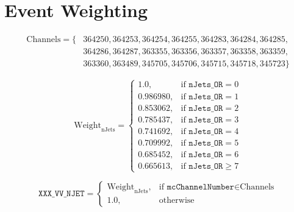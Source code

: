 \clearpage

\section{Event Weighting}
\label{appendix:weights}


\begin{align}
    \text{Channels} = \{
     & 364250, 364253, 364254, 364255, 364283, 364284, 364285,  \nonumber \\
     & 364286, 364287, 363355, 363356, 363357, 363358, 363359,            \\
     & 363360, 363489, 345705, 345706, 345715, 345718, 345723\} \nonumber
\end{align}

\begin{equation}
    \text{Weight}_{\text{nJets}} = \begin{cases}
        1.0,      & \text{if } \texttt{nJets\_OR} = 0    \\
        0.986980, & \text{if } \texttt{nJets\_OR} = 1    \\
        0.853062, & \text{if } \texttt{nJets\_OR} = 2    \\
        0.785437, & \text{if } \texttt{nJets\_OR} = 3    \\
        0.741692, & \text{if } \texttt{nJets\_OR} = 4    \\
        0.709992, & \text{if } \texttt{nJets\_OR} = 5    \\
        0.685452, & \text{if } \texttt{nJets\_OR} = 6    \\
        0.665613, & \text{if } \texttt{nJets\_OR} \geq 7
    \end{cases}
\end{equation}

\begin{equation}
    \texttt{XXX\_VV\_NJET} = \begin{cases}
        \text{Weight}_{\text{nJets}}, & \text{if } \texttt{mcChannelNumber} \in \text{Channels} \\
        1.0,                          & \text{otherwise}
    \end{cases}
\end{equation}

